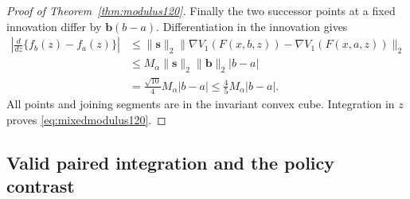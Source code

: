 \begin{proof}[Proof of Theorem~\ref{thm:modulus120}]
Finally the two successor points at a fixed innovation differ by
$\boldsymbol b(b-a)$.  Differentiation in the innovation gives
\begin{align*}
 \left|\frac{d}{dz}\{f_b(z)-f_a(z)\}\right|
 &\le\|\boldsymbol s\|_2
    \|\nabla V_1(F(x,b,z))-\nabla V_1(F(x,a,z))\|_2\\
 &\le M_\alpha\|\boldsymbol s\|_2\|\boldsymbol b\|_2|b-a|\\
 &=\frac{\sqrt{10}}4M_\alpha|b-a|
 \le\frac45M_\alpha|b-a|.
\end{align*}
All points and joining segments are in the invariant convex cube.
Integration in $z$ proves \eqref{eq:mixedmodulus120}.
\end{proof}

\subsection{Valid paired integration and the policy contrast}

